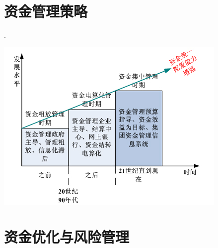 \clearbeforecontfalse

\ifdefined\assetCont{\begincont}\fi


    \section {资金管理策略}

        .
        \begin{center}
            \includegraphics[scale=0.6] {struct1.jpg}
        \end{center}



    \section {资金优化与风险管理}


    

\ifdefined\assetCont{\endcont}\fi

